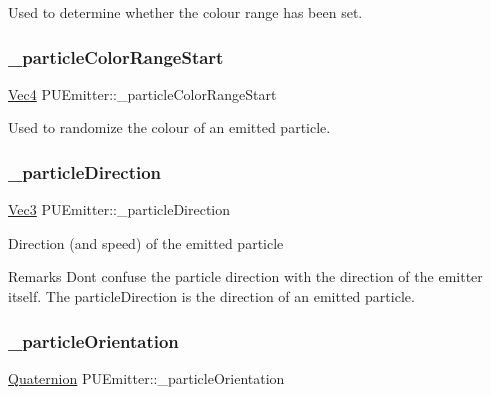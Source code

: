 Used to determine whether the colour range has been set. \mbox{\label{classPUEmitter_a5f8e8341950bf074716ef9095f182e8c}} 
\subsubsection{\texorpdfstring{\+\_\+particle\+Color\+Range\+Start}{\_particleColorRangeStart}}
{\footnotesize\ttfamily \hyperlink{classVec4}{Vec4} P\+U\+Emitter\+::\+\_\+particle\+Color\+Range\+Start\hspace{0.3cm}{\ttfamily [protected]}}

Used to randomize the colour of an emitted particle. \mbox{\label{classPUEmitter_a0499f306a39420300565df42c5d20459}} 
\subsubsection{\texorpdfstring{\+\_\+particle\+Direction}{\_particleDirection}}
{\footnotesize\ttfamily \hyperlink{classVec3}{Vec3} P\+U\+Emitter\+::\+\_\+particle\+Direction\hspace{0.3cm}{\ttfamily [protected]}}

Direction (and speed) of the emitted particle \begin{DoxyRemark}{Remarks}
Don\textquotesingle{}t confuse the particle direction with the direction of the emitter itself. The particle\+Direction is the direction of an emitted particle. 
\end{DoxyRemark}
\mbox{\label{classPUEmitter_a2b4c7199635cd089a5bc019be5ee262b}} 
\subsubsection{\texorpdfstring{\+\_\+particle\+Orientation}{\_particleOrientation}}
{\footnotesize\ttfamily \hyperlink{classQuaternion}{Quaternion} P\+U\+Emitter\+::\+\_\+particle\+Orientation\hspace{0.3cm}{\ttfamily [protected]}}

